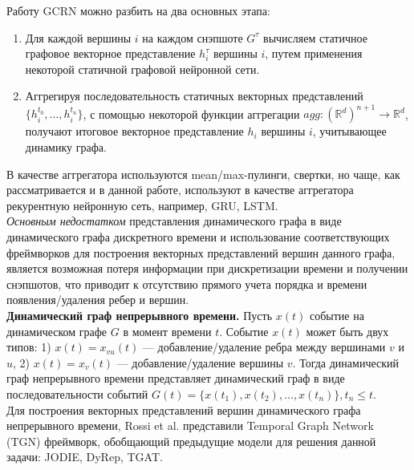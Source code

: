 \documentclass{mipt-thesis-ms}
\renewcommand{\leq}{\leqslant}  %
\begin{document}
Работу GCRN можно разбить на два основных этапа:
\begin{enumerate}
\item Для каждой вершины $i$ на каждом снэпшоте $G^{\tau}$ вычисляем статичное графовое векторное представление $h_i^{\tau}$ вершины $i$, путем применения некоторой статичной графовой нейронной сети.
\item Аггрегируя последовательность статичных векторных представлений $\{h_i^{t_0}, \dots, h_i^{t_n}\}$, с помощью некоторой функции аггрегации $agg: (\mathbb{R}^d)^{n+1} \rightarrow \mathbb{R}^d$, получают итоговое векторное представление $h_i$ вершины $i$, учитывающее динамику графа.
\end{enumerate}

В качестве аггрегатора используются mean/max-пулинги, свертки, но чаще, как рассматривается и в данной работе, используют в качестве аггрегатора рекурентную нейронную сеть, например, GRU, LSTM.\\

{\it Основным недостатком} представления динамического графа в виде динамического графа дискретного времени и использование соответствующих фреймворков для построения векторных представлений вершин данного графа, является возможная потеря информации при дискретизации времени и получении снэпшотов, что приводит к отсутствию прямого учета порядка и времени появления/удаления ребер и вершин.\\

{\bf Динамический граф непрерывного времени.} Пусть $x(t)$ событие на динамическом графе $G$ в момент времени $t$. Событие $x(t)$ может быть двух типов: 1) $x(t) = x_{vu}(t)$ --- добавление/удаление ребра между вершинами $v$ и $u$, 2) $x(t) = x_v(t)$ --- добавление/удаление вершины $v$. Тогда динамический граф непрерывного времени представляет динамический граф в виде последовательности событий $G(t) = \{x(t_1), x(t_2), \dots, x(t_n)\}, t_n \leq t$.\\

Для построения векторных представлений вершин динамического графа непрерывного времени, Rossi et al. представили Temporal Graph Network (TGN) фреймворк, обобщающий предыдущие модели для решения данной задачи: JODIE, DyRep, TGAT.\\
\end{document}
